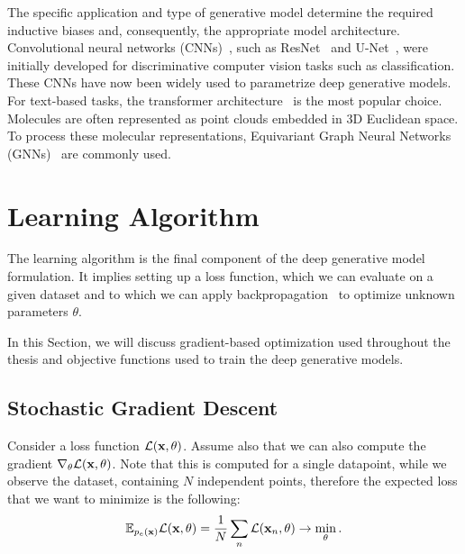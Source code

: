 The specific application and type of generative model determine the required inductive biases and, consequently, the appropriate model architecture.
Convolutional neural networks (CNNs)~\citep{krizhevsky2012imagenet}, such as ResNet~\citep{he2016deep} and U-Net~\citep{ronneberger2015u}, were initially developed for discriminative computer vision tasks such as classification. These CNNs have now been widely used to parametrize deep generative models. For text-based tasks, the transformer architecture~\citep{vaswani2017attention} is the most popular choice. Molecules are often represented as point clouds embedded in 3D Euclidean space. To process these molecular representations, Equivariant Graph Neural Networks (GNNs)~\citep{satorras2021n} are commonly used. 

\section{Learning Algorithm}
The learning algorithm is the final component of the deep generative model formulation. 
It implies setting up a loss function, which we can evaluate on a given dataset and to which we can apply backpropagation~\citep{rumelhart1986learning} to optimize unknown parameters $\theta$. 

In this Section, we will discuss gradient-based optimization used throughout the thesis and objective functions used to train the deep generative models. 

\subsection{Stochastic Gradient Descent}
Consider a loss function $\mathcal{L}({\mathbf{x}}, \theta)$. 
Assume also that we can also compute the gradient $\nabla_\theta \mathcal{L}({\mathbf{x}}, \theta)$. Note that this is computed for a single datapoint, while we observe the dataset, containing $N$ independent points, therefore the expected loss that we want to minimize is the following:
\begin{equation}\label{eq:intro_loss}
\E_{p_e(\rvx)} \mathcal{L}(\rvx, \theta) = \frac1N \sum_n \mathcal{L}(\rvx_n, \theta) \rightarrow \min_{\theta}.
\end{equation}

